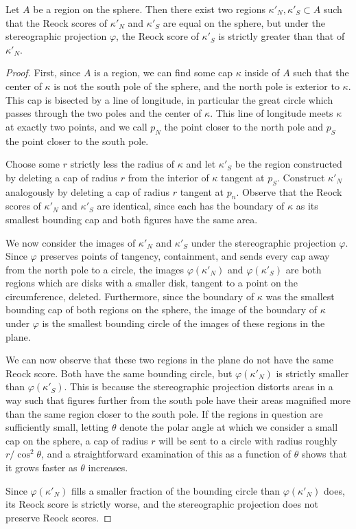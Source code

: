 \begin{theorem}\label{thm:reock}
	Let $A$ be a region on the sphere.  Then there exist two regions $\kappa'_N,\kappa'_S\subset A$ such that the Reock scores of $\kappa'_N$ and $\kappa'_S$ are equal on the sphere, but under the stereographic projection $\varphi$, the Reock score of $\kappa'_S$ is strictly greater than that of $\kappa'_N$. 
\end{theorem}

\begin{proof}
	First, since $A$ is a region, we can find some cap $\kappa$ inside of $A$ such that the center of $\kappa$ is not the south pole of the sphere, and the north pole is exterior to $\kappa$.  This cap is bisected by a line of longitude, in particular the great circle which passes through the two poles and the center of $\kappa$.  This line of longitude meets $\kappa$ at exactly two points, and we call $p_N$ the point closer to the north pole and $p_S$ the point closer to the south pole.
	
	Choose some $r$ strictly less the radius of $\kappa$ and let $\kappa'_S$ be the region constructed by deleting a cap of radius $r$ from the interior of $\kappa$ tangent at $p_S$.  Construct $\kappa'_N$ analogously by deleting a cap of radius $r$ tangent at $p_n$. Observe that the Reock scores of $\kappa'_N$ and $\kappa'_S$ are identical, since each has the boundary of $\kappa$ as its smallest bounding cap and both figures have the same area.
	
	We now consider the images of $\kappa'_N$ and $\kappa'_S$ under the stereographic projection $\varphi$.  Since $\varphi$ preserves points of tangency, containment, and sends every cap away from the north pole to a circle, the images $\varphi(\kappa'_N)$ and $\varphi(\kappa'_S)$ are both regions which are disks with a smaller disk, tangent to a point on the circumference, deleted.  Furthermore, since the boundary of $\kappa$ was the smallest bounding cap of both regions on the sphere, the image of the boundary of $\kappa$ under $\varphi$ is the smallest bounding circle of the images of these regions in the plane.
	
	We can now observe that these two regions in the plane do not have the same Reock score.  Both have the same bounding circle, but $\varphi(\kappa'_N)$ is strictly smaller than $\varphi(\kappa'_S)$.  This is because the stereographic projection distorts areas in a way such that figures further from the south pole have their areas magnified more than the same region closer to the south pole.  If the regions in question are sufficiently small, letting $\theta$ denote the polar angle at which we consider a small cap on the sphere, a cap of radius $r$ will be sent to a circle with radius roughly $r/\cos^2{\theta}$, and a straightforward examination of this as a function of $\theta$ shows that it grows faster as $\theta$ increases.
	
	Since $\varphi(\kappa'_N)$ fills a smaller fraction of the bounding circle than $\varphi(\kappa'_N)$ does, its Reock score is strictly worse, and the stereographic projection does not preserve Reock scores.
\end{proof}